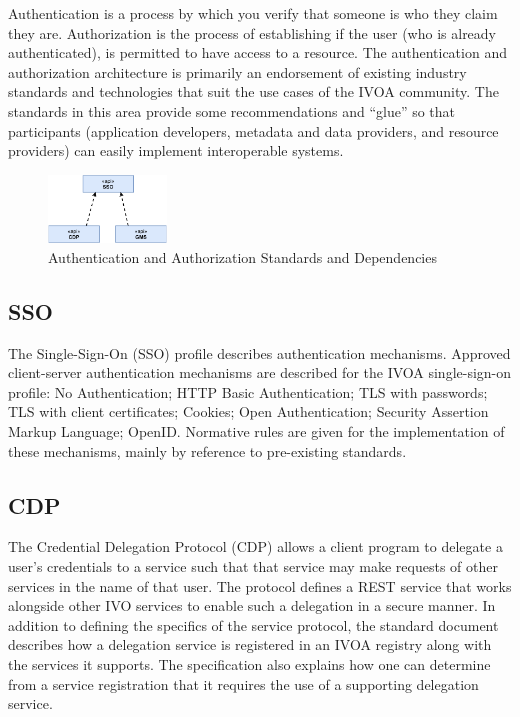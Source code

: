 \documentclass[11pt,a4paper]{ivoa}
\begin{document}
Authentication is a process by which you verify that someone is who they claim they 
are. Authorization is the process of establishing if the user (who is already authenticated), 
is permitted to have access to a resource. The authentication and authorization architecture 
is primarily an endorsement of existing
industry standards and technologies that suit the use cases of the IVOA community. The standards
in this area provide some recommendations and ``glue'' so that participants (application
developers, metadata and data providers, and resource providers) can easily implement interoperable
systems.

\begin{figure}[h]
\centering
\includegraphics[width=0.28\textwidth]{ivoa-arch-auth.pdf}
\caption{Authentication and Authorization Standards and Dependencies}
\label{fig:authdeps}
\end{figure}

\subsection{SSO}

The Single-Sign-On (SSO) \citep{2017ivoa.spec.0524T} profile describes authentication mechanisms. Approved client-server 
authentication mechanisms are described for the IVOA single-sign-on profile: No Authentication; 
HTTP Basic Authentication; TLS with passwords; TLS with client certificates; Cookies; Open 
Authentication; Security Assertion Markup Language; OpenID. Normative rules are given for 
the implementation of these mechanisms, mainly by reference to pre-existing standards.

\subsection{CDP}

The Credential Delegation Protocol (CDP) \citep{2010ivoa.spec.0218P} allows a client program to delegate a user's credentials 
to a service such that that service may make requests of other services in the name of that 
user. The protocol defines a REST service that works alongside other IVO services to enable 
such a delegation in a secure manner. In addition to defining the specifics of the service 
protocol, the standard document describes how a delegation service is registered in an IVOA registry 
along with the services it supports. The specification also explains how one can determine 
from a service registration that it requires the use of a supporting delegation service. 
\end{document}

